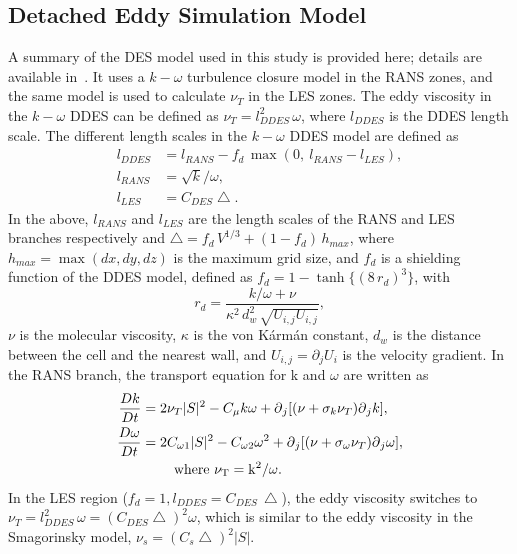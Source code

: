 \subsection{Detached Eddy Simulation Model}
\label{sec:DDES}
%
A summary of the DES model used in this study is provided here; details are
available in~\cite{yin2015dynamic}. It uses a $k-\omega$ turbulence closure
model in the RANS zones, and the same model is used to calculate $\nu_T$ in the
LES zones. The eddy viscosity in the $k-\omega$ DDES can be defined as
$\nu_T=l_{DDES}^2\, \omega$, where $l_{DDES}$ is the DDES length scale. The
different length scales in the $k-\omega$ DDES model are defined as
%
\begin{align}  
  l_{DDES} &=l_{RANS}-f_d\, \max( 0,~l_{RANS}-l_{LES}), \nonumber \\
  l_{RANS} &=\sqrt{k}/\omega, \\
  l_{LES} &=C_{DES}\bigtriangleup. \nonumber
  \label{eq:ddes_lscale}
\end{align}
%
In the above, $l_{RANS}$ and $l_{LES}$ are the length scales of the RANS and LES
branches respectively and $\bigtriangleup = f_d \,V^{1/3}+(1-f_d ) \,h_{max}$,
where $h_{max} = \max(dx,dy,dz)$ is the maximum grid size, and $f_d$ is a
shielding function of the DDES model, defined as $f_d = 1 -
\tanh\{(8\,r_d)^3\}$, with
\[
  r_d=\frac{k/\omega+\nu}{\kappa^2 \, d_w^2 \, \sqrt{U_{i,j} U_{i,j} }},
\]
$\nu$ is the molecular viscosity, $\kappa$ is the von K\'arm\'an constant, $d_w$ is
the distance between the cell and the nearest wall, and $U_{i,j}=\partial_j
U_i$ is the velocity gradient.  In the RANS branch, the transport equation for
k and $\omega$ are written as
%
\begin{align}  
  \frac{Dk}{Dt} & = 2\nu_T |S|^2-C_\mu k\omega+\partial{_j [(\nu+\sigma_k \nu_T ) \partial{_j k}]}, \nonumber \\
  \frac{D\omega}{Dt} & = 2C_{\omega1} |S|^2-C_{\omega2} \omega^2 
                    +\partial{_j [(\nu+\sigma_\omega \nu_T )\partial{_j \omega}]},\\
    &~~~~~~~\rm{where}~\nu_T=k^2/\omega. \nonumber
    \label{eq:transportEqs}
\end{align}  
%
In the LES region ($f_d=1,l_{DDES}=C_{DES} \, \bigtriangleup$), the eddy
viscosity switches to
$\nu_T=l_{DDES}^2\,\omega=(C_{DES}\bigtriangleup)^2\omega$, which is similar to
the eddy viscosity in the Smagorinsky model, $\nu_s=(C_s \bigtriangleup)^2
|S|$.

